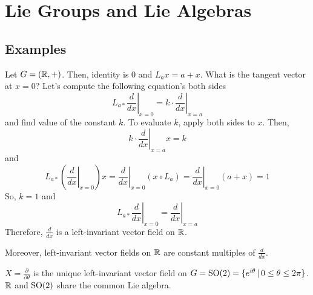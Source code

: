 \documentclass[a4paper, 10pt]{article}
\begin{document}
\setcounter{section}{7}
\section{Lie Groups and Lie Algebras}

\setcounter{subsection}{2}
\subsection{Examples}

\setcounter{theorem}{13}
\begin{example}
    Let $G = (\mathbb{R}, +)$. Then, identity is 0 and $L_{a}x = a + x$. What is the tangent vector at $x = 0$? Let's compute the following equation's both sides
    \[ L_{a\ast} \left.\frac{d}{dx}\right|_{x=0} = k \cdot \left.\frac{d}{dx}\right|_{x=a} \]
    and find value of the constant $k$. To evaluate $k$, apply both sides to $x$. Then,
    \[ k \cdot \left.\frac{d}{dx}\right|_{x=a}x = k \]
    and
    \[ L_{a\ast} \left( \left.\frac{d}{dx}\right|_{x=0} \right)x = \left.\frac{d}{dx}\right|_{x=0} (x \circ L_{a}) = \left.\frac{d}{dx}\right|_{x=0} (a+x) = 1 \]
    So, $k=1$ and
    \[ \boxed{ L_{a\ast} \left.\frac{d}{dx}\right|_{x=0} = \left.\frac{d}{dx}\right|_{x=a} } \]
    Therefore, $\displaystyle{\frac{d}{dx}}$ is a left-invariant vector field on $\mathbb{R}$.
    
    Moreover, left-invariant vector fields on $\mathbb{R}$ are constant multiples of $\displaystyle{\frac{d}{dx}}$.
\end{example}

\begin{remark}
    $\displaystyle{X = \frac{\partial}{\partial\theta}}$ is the unique left-invariant vector field on $G = \mathrm{SO}(2) = \{e^{i\theta} \,|\, 0 \leq \theta \leq 2\pi\}$. $\mathbb{R}$ and $\mathrm{SO(2)}$ share the common Lie algebra.
\end{remark}

\newpage

\end{document}
